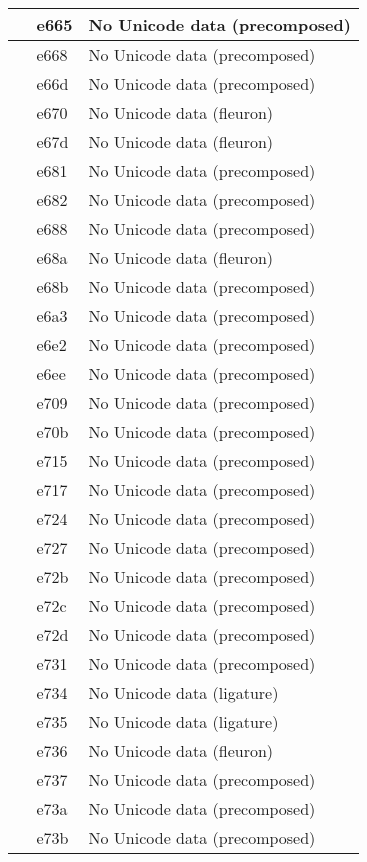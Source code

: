 \documentclass[12pt,letterpaper,openany]{book}
\begin{document}
\begin{center}
\begin{supertabular}{|m{0.25in}|m{0.5in}|m{4in}|}
			 & e665 & No Unicode data (precomposed)\\\hline
			 & e668 & No Unicode data (precomposed)\\\hline
			 & e66d & No Unicode data (precomposed)\\\hline
			 & e670 & No Unicode data (fleuron)\\\hline
			 & e67d & No Unicode data (fleuron)\\\hline
			 & e681 & No Unicode data (precomposed)\\\hline
			 & e682 & No Unicode data (precomposed)\\\hline
			 & e688 & No Unicode data (precomposed)\\\hline
			 & e68a & No Unicode data (fleuron)\\\hline
			 & e68b & No Unicode data (precomposed)\\\hline
			 & e6a3 & No Unicode data (precomposed)\\\hline
			 & e6e2 & No Unicode data (precomposed)\\\hline
			 & e6ee & No Unicode data (precomposed)\\\hline
			 & e709 & No Unicode data (precomposed)\\\hline
			 & e70b & No Unicode data (precomposed)\\\hline
			 & e715 & No Unicode data (precomposed)\\\hline
			 & e717 & No Unicode data (precomposed)\\\hline
			 & e724 & No Unicode data (precomposed)\\\hline
			 & e727 & No Unicode data (precomposed)\\\hline
			 & e72b & No Unicode data (precomposed)\\\hline
			 & e72c & No Unicode data (precomposed)\\\hline
			 & e72d & No Unicode data (precomposed)\\\hline
			 & e731 & No Unicode data (precomposed)\\\hline
			 & e734 & No Unicode data (ligature)\\\hline
			 & e735 & No Unicode data (ligature)\\\hline
			 & e736 & No Unicode data (fleuron)\\\hline
			 & e737 & No Unicode data (precomposed)\\\hline
			 & e73a & No Unicode data (precomposed)\\\hline
			 & e73b & No Unicode data (precomposed)\\\hline

\end{supertabular}
\end{center}
\end{document}

